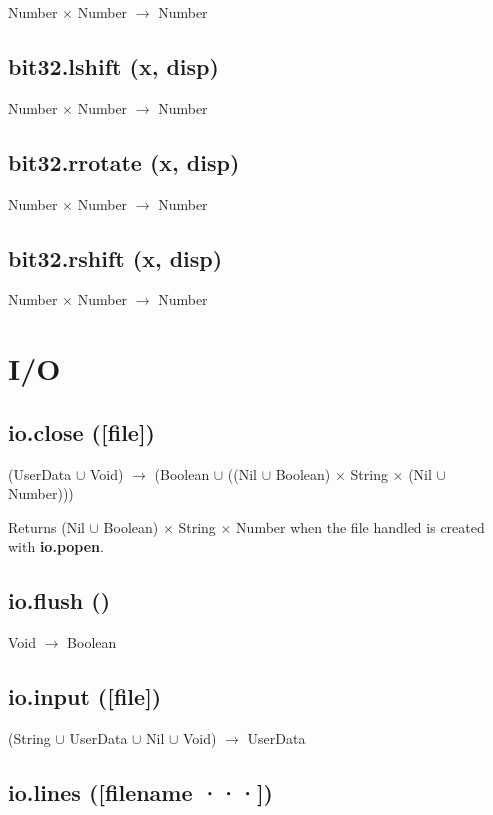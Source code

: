\documentclass[12pt]{article}
\begin{document}
Number $\times$ Number $\rightarrow$ Number

\subsection{bit32.lshift (x, disp)}

Number $\times$ Number $\rightarrow$ Number

\subsection{bit32.rrotate (x, disp)}

Number $\times$ Number $\rightarrow$ Number

\subsection{bit32.rshift (x, disp)}

Number $\times$ Number $\rightarrow$ Number

\newpage

\section{I/O}

\subsection{io.close ([file])}

(UserData $\cup$ Void) $\rightarrow$
(Boolean $\cup$ ((Nil $\cup$ Boolean) $\times$ String $\times$ (Nil $\cup$ Number)))

Returns (Nil $\cup$ Boolean) $\times$ String $\times$ Number when
the file handled is created with \textbf{io.popen}.

\subsection{io.flush ()}

Void $\rightarrow$ Boolean

\subsection{io.input ([file])}

(String $\cup$ UserData $\cup$ Nil $\cup$ Void) $\rightarrow$
UserData

\subsection{io.lines ([filename ···])}
\end{document}
